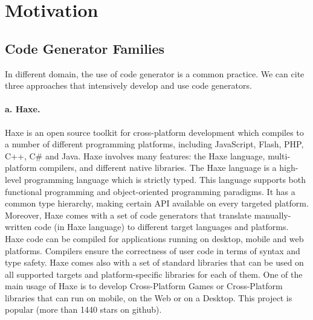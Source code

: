 
\section{Motivation}

\subsection{Code Generator Families}

In different domain, the use of code generator is a common practice. We can cite three approaches that intensively develop and use code generators. 

\paragraph{a. Haxe.} 	Haxe is an open source toolkit for cross-platform development which compiles to a number of different programming platforms, including JavaScript, Flash, PHP, C++, C\# and Java. Haxe involves many features: the Haxe language, multi-platform compilers, and different native libraries. The Haxe language is a high-level programming language which is strictly typed. This language supports both functional programming and object-oriented programming paradigms. It has a common type hierarchy, making certain API available on every targeted platform. Moreover, Haxe comes with a set of code generators that translate manually-written code (in Haxe language) to different target languages and platforms.  Haxe code can be compiled for applications running on desktop, mobile and web platforms. Compilers ensure the correctness of user code in terms of syntax and type safety. Haxe comes also with a set of standard libraries that can be used on all supported targets and platform-specific libraries for each of them. One of the main usage of Haxe is to develop Cross-Platform Games or Cross-Platform libraries that can run on mobile, on the Web or on a Desktop.  	This project is popular (more than 1440 stars on github).

